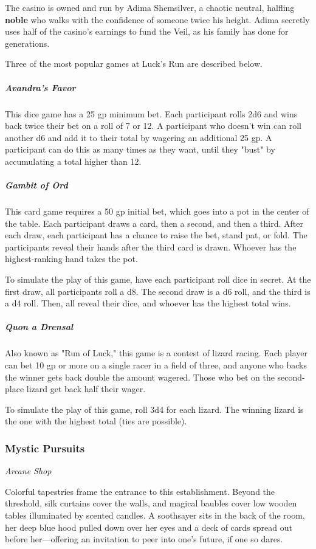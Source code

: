\documentclass[10pt,a4paper,twoside,bg=print,twocolumn,openany,nodeprecatedcode]{dndbook}
\begin{document}
The casino is owned and run by Adima Shemsilver, a chaotic neutral, halfling \textbf{noble} who walks with the confidence of someone twice his height. Adima secretly uses half of the casino's earnings to fund the Veil, as his family has done for generations.

Three of the most popular games at Luck's Run are described below.

\subparagraph{Avandra's Favor}
This dice game has a 25 gp minimum bet. Each participant rolls 2d6 and wins back twice their bet on a roll of 7 or 12. A participant who doesn't win can roll another d6 and add it to their total by wagering an additional 25 gp. A participant can do this as many times as they want, until they "bust" by accumulating a total higher than 12.

\subparagraph{Gambit of Ord}
This card game requires a 50 gp initial bet, which goes into a pot in the center of the table. Each participant draws a card, then a second, and then a third. After each draw, each participant has a chance to raise the bet, stand pat, or fold. The participants reveal their hands after the third card is drawn. Whoever has the highest-ranking hand takes the pot.

To simulate the play of this game, have each participant roll dice in secret. At the first draw, all participants roll a d8. The second draw is a d6 roll, and the third is a d4 roll. Then, all reveal their dice, and whoever has the highest total wins.

\subparagraph{Quon a Drensal}
Also known as "Run of Luck," this game is a contest of lizard racing. Each player can bet 10 gp or more on a single racer in a field of three, and anyone who backs the winner gets back double the amount wagered. Those who bet on the second-place lizard get back half their wager.

To simulate the play of this game, roll 3d4 for each lizard. The winning lizard is the one with the highest total (ties are possible).

\subsubsection{Mystic Pursuits}
\textit{Arcane Shop}

Colorful tapestries frame the entrance to this establishment. Beyond the threshold, silk curtains cover the walls, and magical baubles cover low wooden tables illuminated by scented candles. A soothsayer sits in the back of the room, her deep blue hood pulled down over her eyes and a deck of cards spread out before her—offering an invitation to peer into one's future, if one so dares.
\end{document}
